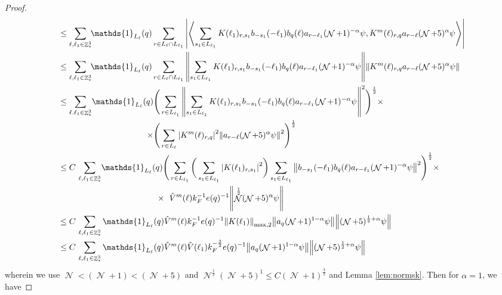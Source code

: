 \documentclass[sn-mathphys, Numbered ,a4paper]{sn-jnl}%
\DeclareMathOperator{\Z}{\mathbb{Z}}
\DeclareMathOperator{\NN}{\mathcal{N}}
\newcommand{\half}{\frac{1}{2}}
\newcommand{\eva}[1]{\left\langle #1 \right\rangle}
\theoremstyle{plain}
\theoremstyle{definition}
\theoremstyle{remark}
\theoremstyle{plain}
\theoremstyle{definition}
\theoremstyle{remark}
\begin{document}
\begin{proof}
\begin{align}
    &\leq \sum\limits_{\ell,\ell_1 \in \Z^3_*} \!\!\mathds{1}_{L_\ell}(q) \sum\limits_{ r \in L_\ell \cap L_{\ell_1}} \abs{\eva{ \sum\limits_{s_1 \in L_{\ell_1}} K(\ell_1)_{r,s_1} b_{-s_1}(-\ell_1) b_{q}(\ell) a_{r-\ell_1} (\NN+1)^{-\alpha} \psi, K^{m}(\ell)_{r,q} a_{r-\ell} (\NN+5)^{\alpha} \psi }}\nonumber\\
    &\leq\sum\limits_{\ell,\ell_1 \in \Z^3_*} \!\!\mathds{1}_{L_\ell}(q) \sum\limits_{ r \in L_\ell \cap L_{\ell_1}}    \norm{\sum\limits_{s_1 \in L_{\ell_1}} K(\ell_1)_{r,s_1} b_{-s_1}(-\ell_1) b_{q}(\ell) a_{r-\ell_1} (\NN+1)^{-\alpha}\psi}\norm{  K^{m}(\ell)_{r,q}  a_{r-\ell} (\NN+5)^{\alpha}\psi } \nonumber\\
    &\leq \sum\limits_{\ell.\ell_1 \in \Z^3_*} \!\!\begin{aligned}[t]\mathds{1}_{L_\ell}(q) \Bigg( &\sum\limits_{r \in L_{\ell_1}} \norm{\sum\limits_{s_1 \in L_{\ell_1}} K(\ell_1)_{r,s_1} b_{-s_1}(-\ell_1) b_{q}(\ell) a_{r-\ell_1} (\NN+1)^{-\alpha}\psi}^2\Bigg)^\half \times\nonumber\\
    \times \Bigg( &\sum\limits_{r \in L_\ell} \abs{K^{m}(\ell)_{r,q} }^2 \norm{   a_{r-\ell} (\NN+5)^{\alpha}\psi }^2\Bigg)^\half \end{aligned}\nonumber\\
    &\leq C\, \sum\limits_{\ell,\ell_1 \in \Z^3_*} \!\!\begin{aligned}[t]\mathds{1}_{L_\ell}(q) \Bigg( &\sum\limits_{r \in L_{\ell_1}} \bigg( \sum\limits_{s_1 \in L_{\ell_1}}\abs{K(\ell_1)_{r,s_1}}^2\bigg) \sum\limits_{s_1 \in L_{\ell_1}} \norm{ b_{-s_1}(-\ell_1) b_{q}(\ell) a_{r-\ell_1} (\NN+1)^{-\alpha}\psi}^2\Bigg)^\half \times\nonumber\\
    \times \;\,\, &\hat{V}^{m}(\ell)k_F^{-1}e(q)^{-1} \norm{ \NN^\half(\NN+5)^{\alpha}\psi }\end{aligned} \nonumber\\
    &\leq  C\,\sum\limits_{\ell,\ell_1 \in \Z^3_*}\mathds{1}_{L_\ell}(q) \hat{V}^{m}(\ell)k_F^{-1}e(q)^{-1}  \norm{K(\ell_1)}_{\mathrm{max,2}}   \norm{   a_{q}(\NN+1)^{1-\alpha}\psi} \norm{  (\NN+5)^{\half+\alpha}\psi } \nonumber\\
    &\leq  C\,\sum\limits_{\ell,\ell_1 \in \Z^3_*}\mathds{1}_{L_\ell}(q) \hat{V}^{m}(\ell)\hat{V}(\ell_1)k_F^{-\frac{3}{2}}e(q)^{-1}     \norm{a_{q}(\NN+1)^{1-\alpha}\psi} \norm{  (\NN+5)^{\half+\alpha}\psi } \nonumber
\end{align}
wherein we use $\NN<(\NN+1)<(\NN+5)$ and $\NN^\half(\NN+5)^1\leq C(\NN+1)^{\frac{3}{2}}$ and Lemma \ref{lem:normsk}. Then for $\alpha = 1$, we have

\end{proof}
\end{document}
